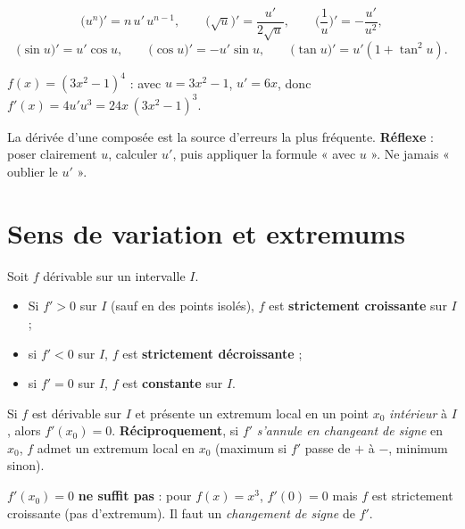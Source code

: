 \begin{propriete}
\[
\big(u^{n}\big)'=n\,u'\,u^{n-1},\qquad
\big(\sqrt u\big)'=\frac{u'}{2\sqrt u},\qquad
\Big(\frac1u\Big)'=-\frac{u'}{u^{2}},
\]
\[
\big(\sin u\big)'=u'\cos u,\qquad \big(\cos u\big)'=-u'\sin u,\qquad \big(\tan u\big)'=u'(1+\tan^{2}u).
\]
\end{propriete}

\begin{exemple}
$f(x)=(3x^{2}-1)^{4}$ : avec $u=3x^{2}-1$, $u'=6x$, donc $f'(x)=4u'u^{3}=24x\,(3x^{2}-1)^{3}$.
\end{exemple}

\begin{remarque}
La dérivée d'une composée est la source d'erreurs la plus fréquente. \textbf{Réflexe} : poser
clairement $u$, calculer $u'$, puis appliquer la formule « avec $u$ ». Ne jamais « oublier le $u'$ ».
\end{remarque}

\section{Sens de variation et extremums}

\begin{theoreme}
Soit $f$ dérivable sur un intervalle $I$.
\begin{itemize}
\item Si $f'>0$ sur $I$ (sauf en des points isolés), $f$ est \textbf{strictement croissante} sur $I$ ;
\item si $f'<0$ sur $I$, $f$ est \textbf{strictement décroissante} ;
\item si $f'=0$ sur $I$, $f$ est \textbf{constante} sur $I$.
\end{itemize}
\end{theoreme}

\begin{theoreme}
Si $f$ est dérivable sur $I$ et présente un extremum local en un point $x_0$ \emph{intérieur} à $I$,
alors $f'(x_0)=0$. \textbf{Réciproquement}, si $f'$ \emph{s'annule en changeant de signe} en $x_0$,
$f$ admet un extremum local en $x_0$ (maximum si $f'$ passe de $+$ à $-$, minimum sinon).
\end{theoreme}

\begin{remarque}
$f'(x_0)=0$ \textbf{ne suffit pas} : pour $f(x)=x^{3}$, $f'(0)=0$ mais $f$ est strictement
croissante (pas d'extremum). Il faut un \emph{changement de signe} de $f'$.
\end{remarque}

